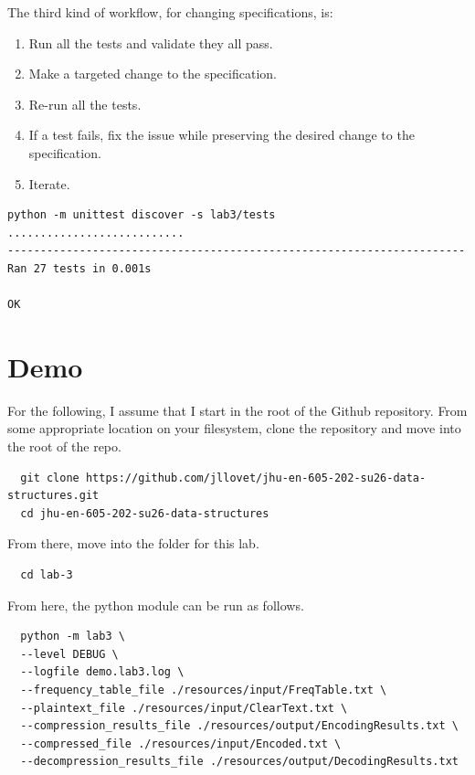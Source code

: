\documentclass[10pt,letterpaper,final]{report}
\begin{document}
\noindent The third kind of workflow, for changing specifications, is:

\begin{enumerate}
  \item Run all the tests and validate they all pass.
  \item Make a targeted change to the specification.
  \item Re-run all the tests.
  \item If a test fails, fix the issue while preserving the desired change to the specification.
  \item Iterate.
\end{enumerate}

{\small
  \begin{verbatim}
python -m unittest discover -s lab3/tests
...........................
----------------------------------------------------------------------
Ran 27 tests in 0.001s

OK
\end{verbatim}
}

\pagebreak
\section{Demo}\label{sec:demo}

For the following, I assume that I start in the root of the Github repository. From some appropriate location on your filesystem, clone the repository and move into the root of the repo.
  {\small
    \begin{verbatim}
  git clone https://github.com/jllovet/jhu-en-605-202-su26-data-structures.git
  cd jhu-en-605-202-su26-data-structures
\end{verbatim}
  }

\noindent From there, move into the folder for this lab.

  {\small
    \begin{verbatim}
  cd lab-3
\end{verbatim}
  }

\noindent From here, the python module can be run as follows.

{\small
  \begin{verbatim}
  python -m lab3 \
  --level DEBUG \
  --logfile demo.lab3.log \
  --frequency_table_file ./resources/input/FreqTable.txt \
  --plaintext_file ./resources/input/ClearText.txt \
  --compression_results_file ./resources/output/EncodingResults.txt \
  --compressed_file ./resources/input/Encoded.txt \
  --decompression_results_file ./resources/output/DecodingResults.txt
\end{verbatim}
}
\end{document}
